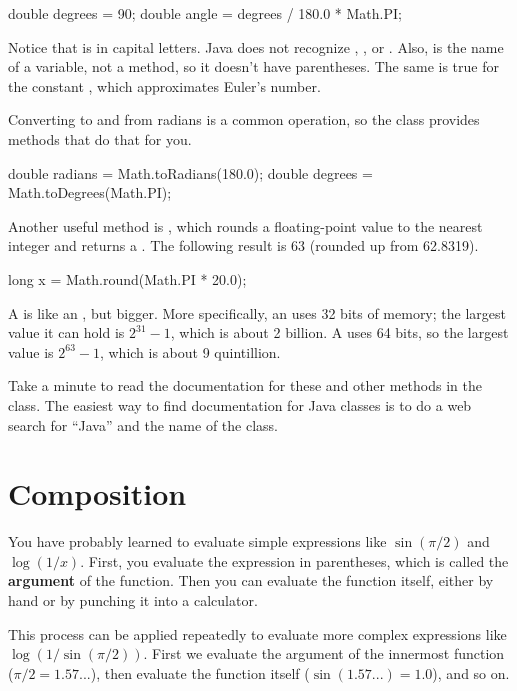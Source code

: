 \begin{code}
double degrees = 90;
double angle = degrees / 180.0 * Math.PI;
\end{code}

Notice that  is in capital letters.
Java does not recognize , , or .
Also,  is the name of a variable, not a method, so it doesn't have parentheses.
The same is true for the constant , which approximates Euler's number.

Converting to and from radians is a common operation, so the  class provides methods that do that for you.

\begin{code}
double radians = Math.toRadians(180.0);
double degrees = Math.toDegrees(Math.PI);
\end{code}


Another useful method is , which rounds a floating-point value to the nearest integer and returns a .
The following result is 63 (rounded up from 62.8319).

\begin{code}
long x = Math.round(Math.PI * 20.0);
\end{code}

A  is like an , but bigger.
More specifically, an  uses 32 bits of memory; the largest value it can hold is $2^{31}-1$, which is about 2 billion.
A  uses 64 bits, so the largest value is $2^{63}-1$, which is about 9 quintillion.

Take a minute to read the documentation for these and other methods in the  class.
The easiest way to find documentation for Java classes is to do a web search for ``Java'' and the name of the class.


\section{Composition}


You have probably learned to evaluate simple expressions like $\sin(\pi/2)$ and $\log(1/x)$.
First, you evaluate the expression in parentheses, which is called the {\bf argument} of the function.
Then you can evaluate the function itself, either by hand or by punching it into a calculator.

This process can be applied repeatedly to evaluate more complex expressions like $\log(1/\sin(\pi/2))$.
First we evaluate the argument of the innermost function ($\pi/2 = 1.57...$), then evaluate the function itself ($\sin(1.57...) = 1.0$), and so on.


